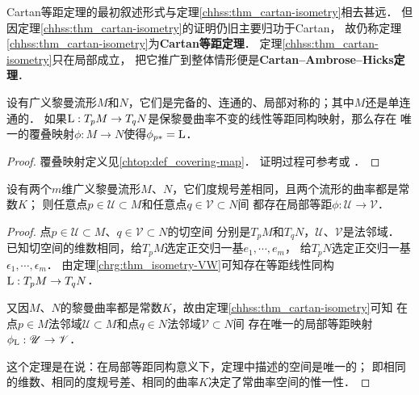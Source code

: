 Cartan等距定理的最初叙述形式与定理\ref{chhss:thm_cartan-isometry}相去甚远．
但因定理\ref{chhss:thm_cartan-isometry}的证明仍旧主要归功于Cartan，
故仍称定理\ref{chhss:thm_cartan-isometry}为{\bfseries\heiti Cartan等距定理}．
定理\ref{chhss:thm_cartan-isometry}只在局部成立，
把它推广到整体情形便是{\bfseries\heiti Cartan--Ambrose--Hicks定理}．


\begin{theorem}\label{chhss:thm_CAH-iso}    
    设有广义黎曼流形$M$和$N$，它们是完备的、连通的、局部对称的；其中$M$还是单连通的．
    如果${\rm L}: T_p M \to T_q N$是保黎曼曲率不变的线性等距同构映射，那么存在
    唯一的覆叠映射$\phi:M\to N$使得$\phi_{p*} = {\rm L}$．
\end{theorem}
\begin{proof}
    覆叠映射定义见\ref{chtop:def_covering-map}．
    证明过程可参考\parencite[8.17]{oneill1983}或
    \parencite[2.3.11]{wolf_SCC-2011}．
\end{proof}


\begin{theorem}\label{chhss:thm_const-curvature}
    设有两个$m$维广义黎曼流形$M$、$N$，它们度规号差相同，且两个流形的曲率都是常数$K$；
    则任意点$p\in \mathscr{U}\subset M$和任意点$q\in \mathscr{V}\subset N$间
    都存在局部等距$\phi:\mathscr{U}\to \mathscr{V}$．
\end{theorem}
\begin{proof}
    点$p\in \mathscr{U}\subset M$、$q\in \mathscr{V}\subset N$的切空间
    分别是$T_p M$和$T_q N$，$\mathscr{U}$、$\mathscr{V}$是法邻域．
    已知切空间的维数相同，给$T_p M$选定正交归一基$e_1,\cdots,e_m$，
    给$T_p N$选定正交归一基$\epsilon_1,\cdots,\epsilon_m$．
    由定理\ref{chrg:thm_isometry-VW}可知存在{\kaishu 等距线性同构}${\rm L}:T_p M\to T_q N$．
    
    又因$M$、$N$的黎曼曲率都是常数$K$，故由定理\ref{chhss:thm_cartan-isometry}可知
    在点$p\in M$法邻域$\mathscr{U}\subset M$和点$q\in N$法邻域$\mathscr{V}\subset N$间
    存在唯一的局部等距映射$\phi_{\rm L}:\mathscr{U}\to \mathscr{V}$．
    
    这个定理是在说：在局部等距同构意义下，定理中描述的空间是{\kaishu 唯一的}；
    即相同的维数、相同的度规号差、相同的曲率$K$决定了{\kaishu 常曲率}空间的{\kaishu 惟一性}．
\end{proof}

